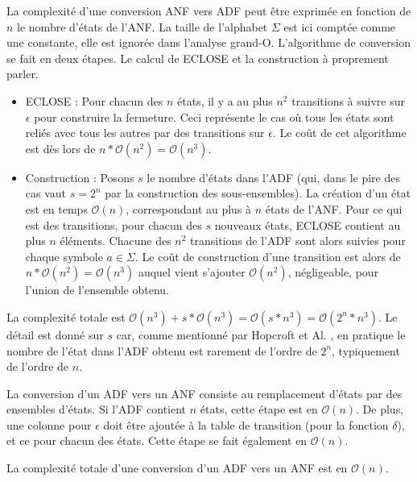\begin{complexity}
	
	La complexité d'une conversion ANF vers ADF peut être exprimée en fonction de $n$ le nombre d'états de l'ANF. La taille de l'alphabet $\Sigma$ est ici comptée comme une constante, elle est ignorée dans l'analyse grand-O. L'algorithme de conversion se fait en deux étapes. Le calcul de ECLOSE et la construction à proprement parler.
	
	\begin{itemize}
		\item ECLOSE : Pour chacun des $n$ états, il y a au plus $n^2$ transitions à suivre sur $\epsilon$ pour construire la fermeture. Ceci représente le cas où tous les états sont reliés avec tous les autres par des transitions sur $\epsilon$. Le coût de cet algorithme est dès lors de $n*\mathcal{O}(n^2)=\mathcal{O}(n^3)$.
		
		\item Construction : Posons $s$ le nombre d'états dans l'ADF (qui, dans le pire des cas vaut $s=2^n$ par la construction des sous-ensembles). La création d'un état est en temps $\mathcal{O}(n)$, correspondant au plus à $n$ états de l'ANF. Pour ce qui est des transitions, pour chacun des $s$ nouveaux états, ECLOSE contient au plus $n$ éléments. Chacune des $n^2$ transitions de l'ADF sont alors suivies pour chaque symbole $a\in\Sigma$. Le coût de construction d'une transition est alors de $n*\mathcal{O}(n^2)=\mathcal{O}(n^3)$ auquel vient s'ajouter $\mathcal{O}(n^2)$, négligeable, pour l'union de l'ensemble obtenu.
	\end{itemize}
	
	La complexité totale est $\mathcal{O}(n^3) + s * \mathcal{O}(n^3) = \mathcal{O}(s*n^3) = \mathcal{O}(2^n*n^3)$.
	Le détail est donné sur $s$ car, comme mentionné par Hopcroft et Al. \cite{Hopcroft00}, en pratique le nombre de l'état dans l'ADF obtenu est rarement de l'ordre de $2^n$, typiquement de l'ordre de $n$.
	
\end{complexity}


\begin{complexity}
	La conversion d'un ADF \automaton vers un ANF consiste au remplacement d'états par des ensembles d'états. Si l'ADF contient $n$ états, cette étape est en $\mathcal{O}(n)$. De plus, une colonne pour $\epsilon$ doit être ajoutée à la table de transition (pour la fonction $\delta$), et ce pour chacun des états. Cette étape se fait également en $\mathcal{O}(n)$.
	
	La complexité totale d'une conversion d'un ADF vers un ANF est en $\mathcal{O}(n)$.
\end{complexity}

